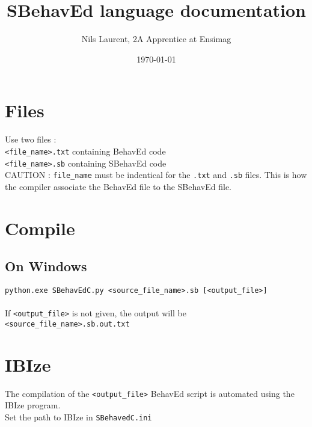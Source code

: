 \documentclass{article}
\title{SBehavEd language documentation}
\author{Nils Laurent, 2A Apprentice at Ensimag}
\date{\today}
\begin{document}
\maketitle

\section{Files}
Use two files :\\
\texttt{<file_name>.txt} containing BehavEd code\\
\texttt{<file_name>.sb} containing SBehavEd code\\
CAUTION : \texttt{file_name} must be indentical for the \texttt{.txt} and \texttt{.sb} files. This is how the compiler associate the BehavEd file to the SBehavEd file.

\section{Compile}
\subsection{On Windows}
\texttt{python.exe SBehavEdC.py <source_file_name>.sb [<output_file>]}\\
\vspace{1mm}\\
If \texttt{<output_file>} is not given, the output will be \texttt{<source_file_name>.sb.out.txt}

\section{IBIze}
The compilation of the \texttt{<output_file>} BehavEd script is automated using the IBIze program.\\
Set the path to IBIze in \texttt{SBehavedC.ini}
\end{document}
